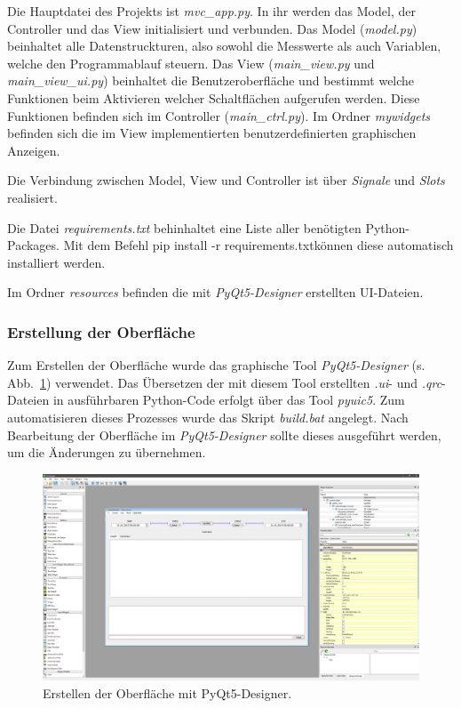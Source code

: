 Die Hauptdatei des Projekts ist \emph{mvc\_app.py}. In ihr werden das Model, der Controller und das View initialisiert und verbunden. Das Model (\emph{model.py}) beinhaltet alle Datenstruckturen, also sowohl die Messwerte als auch Variablen, welche den Programmablauf steuern. Das View (\emph{main\_view.py} und \emph{main\_view\_ui.py}) beinhaltet die Benutzeroberfläche und bestimmt welche Funktionen beim Aktivieren welcher Schaltflächen aufgerufen werden. Diese Funktionen befinden sich im Controller (\emph{main\_ctrl.py}). Im Ordner \emph{mywidgets} befinden sich die im View implementierten benutzerdefinierten graphischen Anzeigen.

Die Verbindung zwischen Model, View und Controller ist über \emph{Signale} und \emph{Slots} realisiert.

Die Datei \emph{requirements.txt} behinhaltet eine Liste aller benötigten Python-Packages. Mit dem Befehl \glqq\textrm{pip install -r requirements.txt}\grqq können diese automatisch installiert werden.

Im Ordner \emph{resources} befinden die mit \emph{PyQt5-Designer} erstellten UI-Dateien.

\subsubsection*{Erstellung der Oberfläche}
Zum Erstellen der Oberfläche wurde das graphische Tool \emph{PyQt5-Designer} (s. Abb.~\ref{fig:ui_design}) verwendet. Das Übersetzen der mit diesem Tool erstellten \emph{.ui}- und \emph{.qrc}-Dateien in ausführbaren Python-Code erfolgt über das Tool \emph{pyuic5}. Zum automatisieren dieses Prozesses wurde das Skript \emph{build.bat} angelegt. Nach Bearbeitung der Oberfläche im \emph{PyQt5-Designer} sollte dieses ausgeführt werden, um die Änderungen zu übernehmen.
\begin{figure}[H]
  \centering
  \includegraphics[width=\textwidth]{./img/ui_design}
  \caption{Erstellen der Oberfläche mit PyQt5-Designer.}\label{fig:ui_design}
\end{figure}


